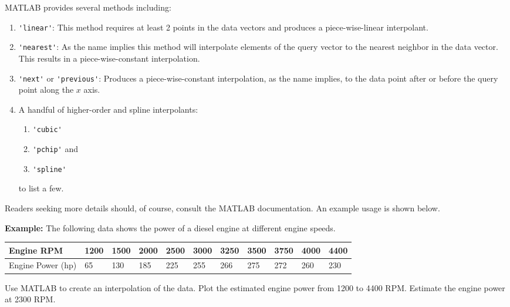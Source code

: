 MATLAB provides several methods including:
\begin{enumerate}
\item \lstinline[style=myMatlab]{'linear'}: This method requires at least 2 points in the data vectors and produces a piece-wise-linear interpolant.

\item \lstinline[style=myMatlab]{'nearest'}:  As the name implies this method will interpolate elements of the query vector to the nearest neighbor in the data vector.  This results in a piece-wise-constant interpolation.

\item \lstinline[style=myMatlab]{'next'} or \lstinline[style=myMatlab]{'previous'}:  Produces a piece-wise-constant interpolation, as the name implies, to the data point after or before the query point along the $x$ axis.

\item A handful of higher-order and spline interpolants:
\begin{enumerate}
\item \lstinline[style=myMatlab]{'cubic'} 
\item \lstinline[style=myMatlab]{'pchip'} and 
\item \lstinline[style=myMatlab]{'spline'} 
\end{enumerate}
to list a few.  

\end{enumerate}
Readers seeking more details should, of course, consult the MATLAB documentation.  An example usage is shown below.

\vspace{0.25cm}

\noindent\textbf{Example: } The following data shows the power of a diesel engine at different engine speeds.

\begin{table}
\begin{tabular}{|l|l|l|l|l|l|l|l|l|l|l|}
\hline
Engine RPM & 1200 & 1500 & 2000 & 2500 & 3000 & 3250 & 3500 & 3750 & 4000 & 4400 \\\hline
Engine Power (hp) & 65 & 130 & 185 & 225 & 255 & 266 & 275 & 272 & 260 & 230 \\ \hline
\end{tabular}
\end{table}
Use MATLAB to create an interpolation of the data.  Plot the estimated engine power from 1200 to 4400 RPM.  Estimate the engine power at 2300 RPM.

